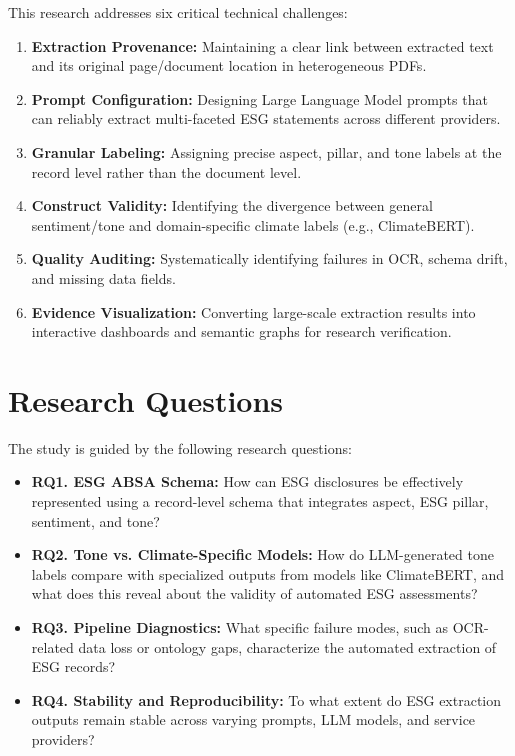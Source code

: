 \documentclass[english, online, cse, master]{dithesis}
\begin{document}
This research addresses six critical technical challenges:
\begin{enumerate}
\item 

\textbf{Extraction Provenance:} Maintaining a clear link between extracted text and its original page/document location in heterogeneous PDFs.\item 

\textbf{Prompt Configuration:} Designing Large Language Model prompts that can reliably extract multi-faceted ESG statements across different providers.\item 

\textbf{Granular Labeling:} Assigning precise aspect, pillar, and tone labels at the record level rather than the document level.\item 

\textbf{Construct Validity:} Identifying the divergence between general sentiment/tone and domain-specific climate labels (e.g., ClimateBERT).\item 

\textbf{Quality Auditing:} Systematically identifying failures in OCR, schema drift, and missing data fields.\item 

\textbf{Evidence Visualization:} Converting large-scale extraction results into interactive dashboards and semantic graphs for research verification.
\end{enumerate}
\section{Research Questions}

The study is guided by the following research questions:
\begin{itemize}
\item 

\textbf{RQ1. ESG ABSA Schema:} How can ESG disclosures be effectively represented using a record-level schema that integrates aspect, ESG pillar, sentiment, and tone?\item 

\textbf{RQ2. Tone vs. Climate-Specific Models:} How do LLM-generated tone labels compare with specialized outputs from models like ClimateBERT, and what does this reveal about the validity of automated ESG assessments?\item 

\textbf{RQ3. Pipeline Diagnostics:} What specific failure modes, such as OCR-related data loss or ontology gaps, characterize the automated extraction of ESG records?\item 

\textbf{RQ4. Stability and Reproducibility:} To what extent do ESG extraction outputs remain stable across varying prompts, LLM models, and service providers?
\end{itemize}
\end{document}
